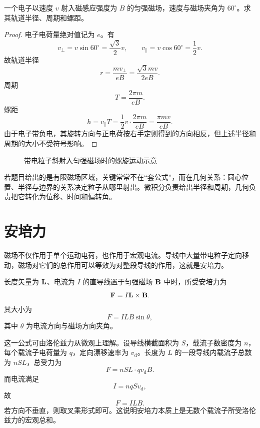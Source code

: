 \begin{example}
一个电子以速度 $v$ 射入磁感应强度为 $B$ 的匀强磁场，速度与磁场夹角为 $60^\circ$。求其轨道半径、周期和螺距。
\end{example}

\begin{proof}
电子电荷量绝对值记为 $e$。有
\[
  v_\perp=v\sin60^\circ=\frac{\sqrt{3}}{2}v,
  \qquad
  v_\parallel=v\cos60^\circ=\frac{1}{2}v.
\]
故轨道半径
\[
  r=\frac{mv_\perp}{eB}=\frac{\sqrt{3}mv}{2eB}.
\]
周期
\[
  T=\frac{2\pi m}{eB}.
\]
螺距
\[
  h=v_\parallel T=\frac{1}{2}v\cdot\frac{2\pi m}{eB}=\frac{\pi mv}{eB}.
\]
由于电子带负电，其旋转方向与正电荷按右手定则得到的方向相反，但上述半径和周期的大小不受符号影响。
\end{proof}

\begin{figure}[H]
\centering
{}
\caption{带电粒子斜射入匀强磁场时的螺旋运动示意}
\end{figure}

\begin{remark}
若题目给出的是有限磁场区域，关键常常不在“套公式”，而在几何关系：圆心位置、半径与边界的关系决定粒子从哪里射出。微积分负责给出半径和周期，几何负责把它转化为位移、时间和偏转角。
\end{remark}

\section{安培力}

磁场不仅作用于单个运动电荷，也作用于宏观电流。导线中大量带电粒子定向移动，磁场对它们的总作用可以等效为对整段导线的作用，这就是安培力。

\begin{law}[安培力公式]
长度矢量为 $\vb{L}$、电流为 $I$ 的直导线置于匀强磁场 $\vb{B}$ 中时，所受安培力为
\[
  \vb{F}=I\vb{L}\times\vb{B}.
\]
其大小为
\[
  F=ILB\sin\theta,
\]
其中 $\theta$ 为电流方向与磁场方向夹角。
\end{law}

这一公式可由洛伦兹力从微观上理解。设导线横截面积为 $S$，载流子数密度为 $n$，每个载流子电荷量为 $q$，定向漂移速率为 $v_\mathrm{d}$。长度为 $L$ 的一段导线内载流子总数为 $nSL$，总受力为
\[
  F=nSL\cdot qv_\mathrm{d}B.
\]
而电流满足
\[
  I=nqSv_\mathrm{d},
\]
故
\[
  F=ILB.
\]
若方向不垂直，则取叉乘形式即可。这说明安培力本质上是无数个载流子所受洛伦兹力的宏观总和。

